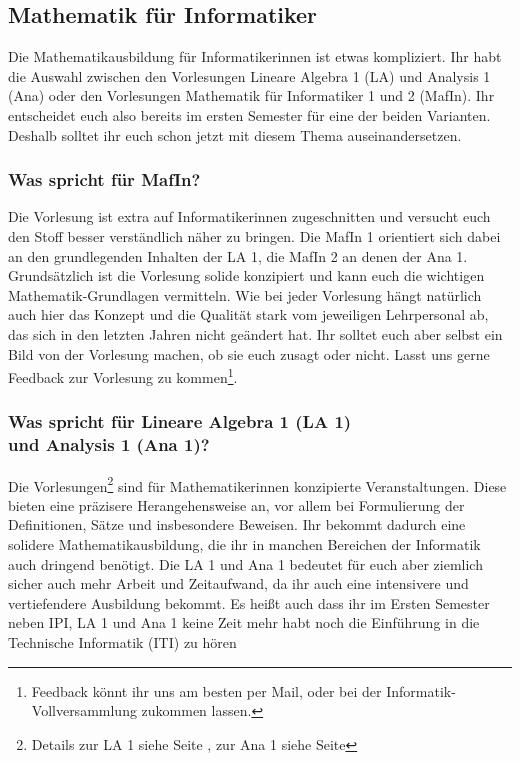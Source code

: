 \subsection{Mathematik für Informatiker}
Die Mathematikausbildung für Informatikerinnen ist etwas kompliziert. Ihr habt die Auswahl zwischen den Vorlesungen Lineare Algebra 1 (\gls{LA}) und Analysis 1 (\gls{Ana}) oder den Vorlesungen Mathematik für Informatiker 1 und 2 (\gls{MafIn}). Ihr entscheidet euch also bereits im ersten Semester für eine der beiden Varianten. Deshalb solltet ihr euch schon jetzt mit diesem Thema auseinandersetzen.
\subsubsection{Was spricht für MafIn?}
Die Vorlesung ist extra auf Informatikerinnen zugeschnitten und versucht euch den Stoff besser verständlich näher zu bringen. Die MafIn 1 orientiert sich dabei an den grundlegenden Inhalten der LA 1, die MafIn 2 an denen der Ana 1. Grundsätzlich ist die Vorlesung solide konzipiert und kann euch die wichtigen Mathematik-Grundlagen vermitteln. Wie bei jeder Vorlesung hängt natürlich auch hier das Konzept und die Qualität stark vom jeweiligen Lehrpersonal ab, das sich in den letzten Jahren nicht geändert hat. Ihr solltet euch aber selbst ein Bild von der Vorlesung machen, ob sie euch zusagt oder nicht. Lasst uns gerne Feedback zur Vorlesung zu kommen\footnote{Feedback könnt ihr uns am besten per Mail, oder bei der Informatik-Vollversammlung zukommen lassen.}.
\subsubsection{Was spricht für Lineare Algebra 1 (LA 1) \\und Analysis 1 (Ana 1)?}
Die Vorlesungen\footnote{Details zur LA 1 siehe Seite \pageref{la1}, zur Ana 1 siehe Seite \pageref{ana1}} sind für Mathematikerinnen konzipierte Veranstaltungen. Diese bieten eine präzisere Herangehensweise an, vor allem bei Formulierung der Definitionen, Sätze und insbesondere Beweisen. Ihr bekommt dadurch eine solidere Mathematikausbildung, die ihr in manchen Bereichen der Informatik auch dringend benötigt. Die LA 1 und Ana 1 bedeutet für euch aber ziemlich sicher auch mehr Arbeit und Zeitaufwand, da ihr auch eine intensivere und vertiefendere Ausbildung bekommt. Es heißt auch dass ihr im Ersten Semester neben \gls{IPI}, LA 1 und Ana 1 keine Zeit mehr habt noch die Einführung in die Technische Informatik (\gls{ITI}) zu hören\\

